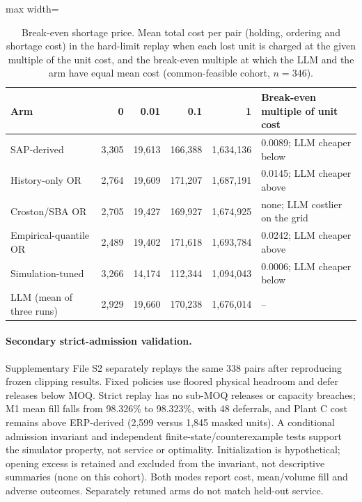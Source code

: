 \documentclass[preprint,12pt,nonatbib]{elsarticle}
\begin{document}
\begin{table}[htbp]
\centering
\caption{Break-even shortage price. Mean total cost per pair (holding, ordering and shortage cost) in the hard-limit replay when each lost unit is charged at the given multiple of the unit cost, and the break-even multiple at which the LLM and the arm have equal mean cost (common-feasible cohort, $n=346$).}
\label{tab:breakeven}
\scriptsize\setlength{\tabcolsep}{3pt}
\begin{adjustbox}{max width=\textwidth}
\begin{tabular}{l r r r r l}
\hline
Arm & 0 & 0.01 & 0.1 & 1 & Break-even multiple of unit cost \\
\hline
SAP-derived & 3{,}305 & 19{,}613 & 166{,}388 & 1{,}634{,}136 & 0.0089; LLM cheaper below \\
History-only OR & 2{,}764 & 19{,}609 & 171{,}207 & 1{,}687{,}191 & 0.0145; LLM cheaper above \\
Croston/SBA OR & 2{,}705 & 19{,}427 & 169{,}927 & 1{,}674{,}925 & none; LLM costlier on the grid \\
Empirical-quantile OR & 2{,}489 & 19{,}402 & 171{,}618 & 1{,}693{,}784 & 0.0242; LLM cheaper above \\
Simulation-tuned & 3{,}266 & 14{,}174 & 112{,}344 & 1{,}094{,}043 & 0.0006; LLM cheaper below \\
LLM (mean of three runs) & 2{,}929 & 19{,}660 & 170{,}238 & 1{,}676{,}014 & -- \\
\hline
\end{tabular}
\end{adjustbox}
\end{table}

\paragraph{Secondary strict-admission validation.} Supplementary File S2 separately replays the same 338 pairs after reproducing frozen clipping results. Fixed policies use floored physical headroom and defer releases below MOQ. Strict replay has no sub-MOQ releases or capacity breaches; M1 mean fill falls from 98.326\% to 98.323\%, with 48 deferrals, and Plant C cost remains above ERP-derived (2{,}599 versus 1{,}845 masked units). A conditional admission invariant and independent finite-state/counterexample tests support the simulator property, not service or optimality. Initialization is hypothetical; opening excess is retained and excluded from the invariant, not descriptive summaries (none on this cohort). Both modes report cost, mean/volume fill and adverse outcomes. Separately retuned arms do not match held-out service.
\end{document}
